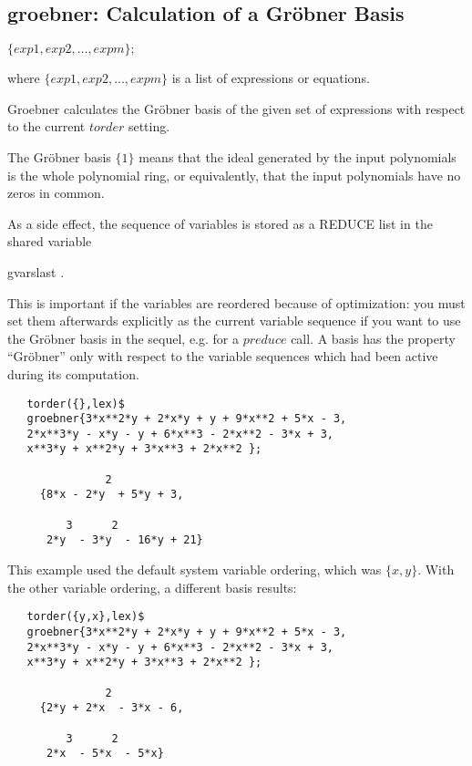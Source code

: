 \subsection{groebner: Calculation of a Gr\"obner Basis}
\begin{description}
\item[{\it groebner}] $\{exp1, exp2, \ldots , expm\}; $

where $\{exp1, exp2, \ldots , expm\}$ is a list of
expressions or equations.

Groebner calculates the Gr\"obner basis of the given set of
expressions with respect to the current $torder$ setting.

The Gr\"obner basis $\{1\}$ means that the ideal generated by the
input polynomials is the whole polynomial ring, or equivalently, that
the input polynomials have no zeros in common.

As a side effect, the sequence of variables is stored as a REDUCE list
in the shared variable
\begin{center}
gvarslast .
\end{center}

This is important if the variables are reordered because of optimization:
you must set them afterwards explicitly as the current variable sequence
if you want to use the Gr\"obner basis in the sequel, e.g. for a
$preduce$ call. A basis has the property ``Gr\"obner'' only with respect
to the variable sequences which had been active during its computation.
\end{description}

\example {}
\begin{verbatim}
   torder({},lex)$
   groebner{3*x**2*y + 2*x*y + y + 9*x**2 + 5*x - 3,
   2*x**3*y - x*y - y + 6*x**3 - 2*x**2 - 3*x + 3,
   x**3*y + x**2*y + 3*x**3 + 2*x**2 };

               2
     {8*x - 2*y  + 5*y + 3,

         3      2
      2*y  - 3*y  - 16*y + 21}
\end{verbatim}


This example used the default system variable ordering, which was
$\{x,y\}$. With the other variable ordering, a different basis results:

\begin{verbatim}
   torder({y,x},lex)$
   groebner{3*x**2*y + 2*x*y + y + 9*x**2 + 5*x - 3,
   2*x**3*y - x*y - y + 6*x**3 - 2*x**2 - 3*x + 3,
   x**3*y + x**2*y + 3*x**3 + 2*x**2 };

               2
     {2*y + 2*x  - 3*x - 6,

         3      2
      2*x  - 5*x  - 5*x}
\end{verbatim}


